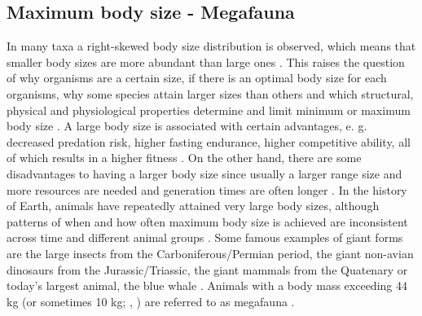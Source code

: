\subsection{Maximum body size - Megafauna}
In many taxa a right-skewed body size distribution is observed, which means that smaller body sizes are more abundant than large ones \citep{Blackburn1994a,Kozlowski2002,Lyons2008}. This raises the question of why organisms are a certain size, if there is an optimal body size for each organisms, why some species attain larger sizes than others and which 
structural, physical and physiological properties determine and limit minimum or maximum body size
\citep{Smith2009}.
A large body size is associated with certain advantages, e. g. decreased predation risk, higher fasting endurance, higher competitive ability, all of which results in a higher fitness \citep{.}.
On the other hand, there are some disadvantages to having a larger body size since usually a larger range size and more resources are needed and generation times are often longer \citep{.}.
In the history of Earth, animals have repeatedly attained very large body sizes, although patterns of when and how often maximum body size is achieved are inconsistent across time and different animal groups \citep{Smith2016}.
Some famous examples of giant forms are the large insects from the Carboniferous/Permian period, the giant non-avian dinosaurs from the Jurassic/Triassic, the giant mammals from the Quatenary or today's largest animal, the blue whale \citep{.}.
Animals with a body mass exceeding 44 kg (or sometimes 10 kg; \citeauthor{Sandom2014}, \citeyear{Sandom2014}) are referred to as megafauna \citep{Barnosky2004, Rhodin2015}.
